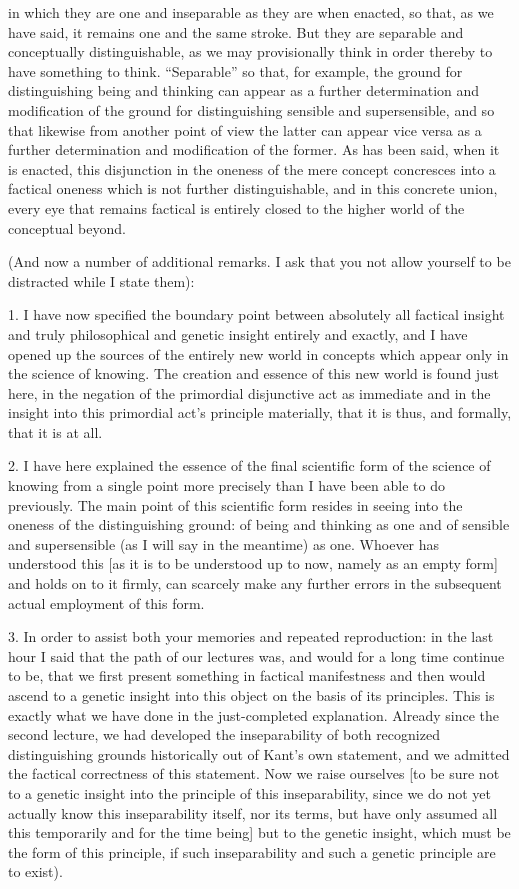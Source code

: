 in which they are one and inseparable
as they are when enacted, so that, as we have said,
it remains one and the same stroke.
But they are separable and conceptually distinguishable,
as we may provisionally think in order thereby
to have something to think.
“Separable” so that, for example, the ground for
distinguishing being and thinking can appear as
a further determination and modification of
the ground for distinguishing sensible and supersensible,
and so that likewise from another point of view
the latter can appear vice versa as
a further determination and modification of the former.
As has been said, when it is enacted,
this disjunction in the oneness of the mere concept
concresces into a factical oneness which is not further distinguishable,
and in this concrete union, every eye that remains factical is
entirely closed to the higher world of the conceptual beyond.

(And now a number of additional remarks.
I ask that you not allow yourself to be
distracted while I state them):

1. I have now specified the boundary point
between absolutely all factical insight
and truly philosophical and genetic insight
entirely and exactly,
and I have opened up the sources of
the entirely new world in concepts
which appear only in the science of knowing.
The creation and essence of this new world is found just here,
in the negation of the primordial disjunctive act as immediate
and in the insight into this primordial act's principle
materially, that it is thus, and formally, that it is at all.

2. I have here explained the essence of
the final scientific form of the science of knowing
from a single point more precisely
than I have been able to do previously.
The main point of this scientific form
resides in seeing into the oneness
of the distinguishing ground:
of being and thinking as one
and of sensible and supersensible
(as I will say in the meantime) as one.
Whoever has understood this
[as it is to be understood up to now,
namely as an empty form]
and holds on to it firmly,
can scarcely make any further errors
in the subsequent actual employment of this form.

3. In order to assist both your memories and repeated reproduction:
in the last hour I said that the path of our lectures was,
and would for a long time continue to be,
that we first present something
in factical manifestness
and then would ascend to
a genetic insight into this object
on the basis of its principles.
This is exactly what we have done
in the just-completed explanation.
Already since the second lecture,
we had developed the inseparability of
both recognized distinguishing grounds
historically out of Kant's own statement,
and we admitted the factical correctness
of this statement.
Now we raise ourselves
[to be sure not to a genetic insight
into the principle of this inseparability,
since we do not yet actually know
this inseparability itself, nor its terms,
but have only assumed all this temporarily
and for the time being]
but to the genetic insight,
which must be the form of this principle,
if such inseparability and
such a genetic principle are to exist).

